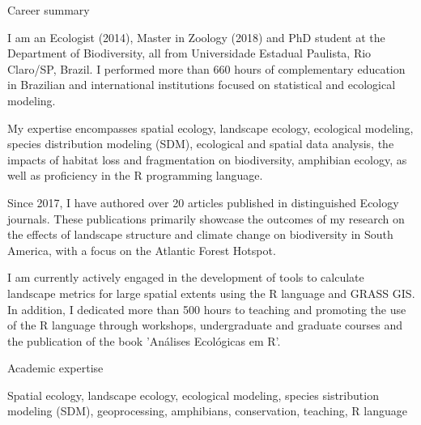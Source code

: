 \documentclass{resume}
\begin{document}

\begin{rSection}{Career summary}

I am an Ecologist (2014), Master in Zoology (2018) and PhD student at the Department of Biodiversity, all from Universidade Estadual Paulista, Rio Claro/SP, Brazil. I performed more than 660 hours of complementary education in Brazilian and international institutions focused on statistical and ecological modeling. 

My expertise encompasses spatial ecology, landscape ecology, ecological modeling, species distribution modeling (SDM), ecological and spatial data analysis, the impacts of habitat loss and fragmentation on biodiversity, amphibian ecology, as well as proficiency in the R programming language. 

Since 2017, I have authored over 20 articles published in distinguished Ecology journals. These publications primarily showcase the outcomes of my research on the effects of landscape structure and climate change on biodiversity in South America, with a focus on the Atlantic Forest Hotspot.

I am currently actively engaged in the development of tools to calculate landscape metrics for large spatial extents using the R language and GRASS GIS. In addition, I dedicated more than 500 hours to teaching and promoting the use of the R language through workshops, undergraduate and graduate courses and the publication of the book 'Análises Ecológicas em R'.

\end{rSection}


\begin{rSection}{Academic expertise}

Spatial ecology, landscape ecology, ecological modeling, species sistribution modeling (SDM), geoprocessing, amphibians, conservation, teaching, R language

\end{rSection}

\end{document}

